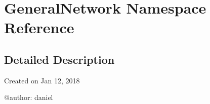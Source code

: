 \hypertarget{namespaceGeneralNetwork}{}\section{General\+Network Namespace Reference}
\label{namespaceGeneralNetwork}


\subsection{Detailed Description}
\begin{DoxyVerb}Created on Jan 12, 2018

@author: daniel
\end{DoxyVerb}
 